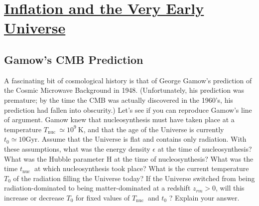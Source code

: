 \section[Inflation and the Very Early Universe]{\hyperlink{toc}{Inflation and the Very Early Universe}}

\subsection{}
\subsection{}
\subsection{}
\subsection*{Gamow's CMB Prediction}
\begin{tcolorbox}
    A fascinating bit of cosmological history is that of George Gamow's prediction of the Cosmic Microwave Background in 1948. (Unfortunately, his prediction was premature; by the time the CMB was actually discovered in the 1960's, his prediction had fallen into obscurity.) Let's see if you can reproduce Gamow's line of argument. Gamow knew that nucleosynthesis must have taken place at a temperature $T_{\text {nuc }} \simeq 10^{9} \mathrm{~K}$, and that the age of the Universe is currently $t_{0} \simeq 10 \mathrm{Gyr}$. Assume that the Universe is flat and contains only radiation. With these assumptions, what was the energy density $\epsilon$ at the time of nucleosynthesis? What was the Hubble parameter $\mathrm{H}$ at the time of nucleosynthesis? What was the time $t_{\text {nuc }}$ at which nucleosynthesis took place? What is the current temperature $T_{0}$ of the radiation filling the Universe today? If the Universe switched from being radiation-dominated to being matter-dominated at a redshift $z_{r m}>0$, will this increase or decrease $T_{0}$ for fixed values of $T_{\text {nuc }}$ and $t_{0}$ ? Explain your answer.
\end{tcolorbox}